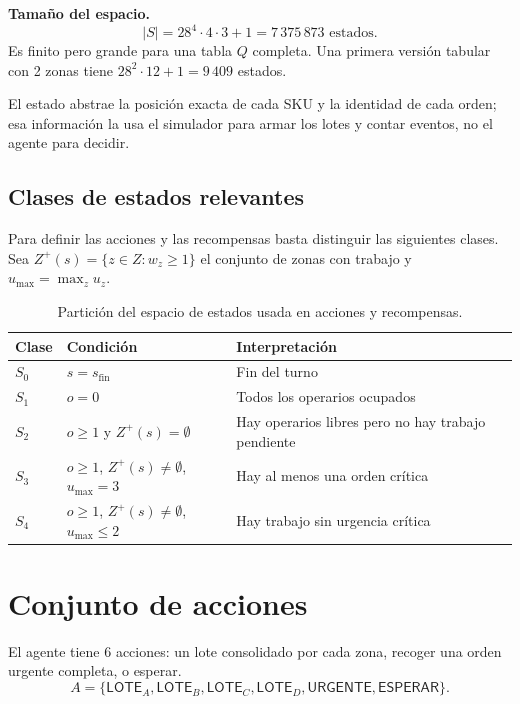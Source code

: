 \documentclass[11pt,letterpaper]{article}
\newcommand{\LOTE}[1]{\mathsf{LOTE}_{#1}}
\newcommand{\URG}{\mathsf{URGENTE}}
\newcommand{\ESP}{\mathsf{ESPERAR}}
\newcommand{\sfin}{s_{\mathrm{fin}}}
\newcommand{\umax}{u_{\max}}
\begin{document}
\textbf{Tamaño del espacio.}
\[
  |S| = 28^4 \cdot 4 \cdot 3 + 1 = 7\,375\,873 \text{ estados.}
\]
Es finito pero grande para una tabla $Q$ completa. Una primera versión tabular con 2 zonas
tiene $28^2\cdot 12 + 1 = 9\,409$ estados.

El estado abstrae la posición exacta de cada SKU y la identidad de cada orden; esa información
la usa el simulador para armar los lotes y contar eventos, no el agente para decidir.

\subsection{Clases de estados relevantes}

Para definir las acciones y las recompensas basta distinguir las siguientes clases. Sea
$Z^{+}(s) = \{z \in Z : w_z \ge 1\}$ el conjunto de zonas con trabajo y
$\umax = \max_{z} u_z$.

\begin{table}[h]
\centering\small
\begin{tabularx}{\textwidth}{@{}p{1cm}p{5.2cm}L@{}}
\toprule
\textbf{Clase} & \textbf{Condición} & \textbf{Interpretación} \\
\midrule
$S_0$ & $s = \sfin$ & Fin del turno \\
$S_1$ & $o = 0$ & Todos los operarios ocupados \\
$S_2$ & $o \ge 1$ y $Z^{+}(s)=\emptyset$ & Hay operarios libres pero no hay trabajo pendiente \\
$S_3$ & $o \ge 1$, $Z^{+}(s)\neq\emptyset$, $\umax = 3$ & Hay al menos una orden crítica \\
$S_4$ & $o \ge 1$, $Z^{+}(s)\neq\emptyset$, $\umax \le 2$ & Hay trabajo sin urgencia crítica \\
\bottomrule
\end{tabularx}
\caption{Partición del espacio de estados usada en acciones y recompensas.}
\end{table}

\section{Conjunto de acciones}

El agente tiene 6 acciones: un lote consolidado por cada zona, recoger una orden urgente completa,
o esperar.
\[
  A = \{\LOTE{A}, \LOTE{B}, \LOTE{C}, \LOTE{D}, \URG, \ESP\}.
\]
\end{document}
